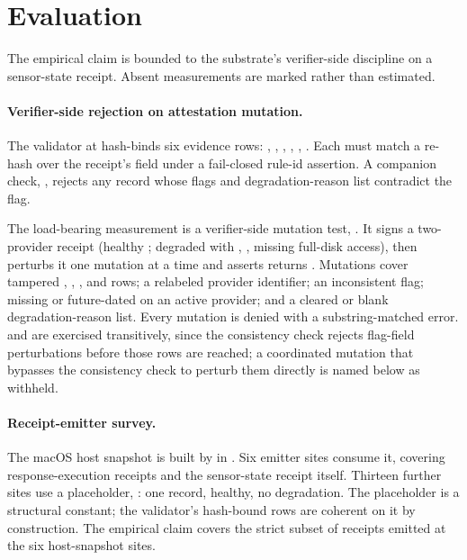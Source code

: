 \section{Evaluation}
\label{sec:evaluation}

The empirical claim is bounded to the substrate's verifier-side discipline on a sensor-state receipt. Absent measurements are marked rather than estimated.

\paragraph{Verifier-side rejection on attestation mutation.}
The validator at  hash-binds six evidence rows: , , , , , . Each must match a re-hash over the receipt's  field under a fail-closed rule-id assertion. A companion check, , rejects any record whose flags and degradation-reason list contradict the  flag.

The load-bearing measurement is a verifier-side mutation test, . It signs a two-provider receipt (healthy ; degraded  with , , missing full-disk access), then perturbs it one mutation at a time and asserts  returns . Mutations cover tampered , , , and  rows; a relabeled provider identifier; an inconsistent  flag; missing or future-dated  on an active provider; and a cleared or blank degradation-reason list. Every mutation is denied with a substring-matched error.  and  are exercised transitively, since the consistency check rejects flag-field perturbations before those rows are reached; a coordinated mutation that bypasses the consistency check to perturb them directly is named below as withheld.

\paragraph{Receipt-emitter survey.}
The macOS host snapshot is built by  in . Six emitter sites consume it, covering response-execution receipts and the sensor-state receipt itself. Thirteen further sites use a placeholder, : one record, healthy, no degradation. The placeholder is a structural constant; the validator's hash-bound rows are coherent on it by construction. The empirical claim covers the strict subset of receipts emitted at the six host-snapshot sites.

